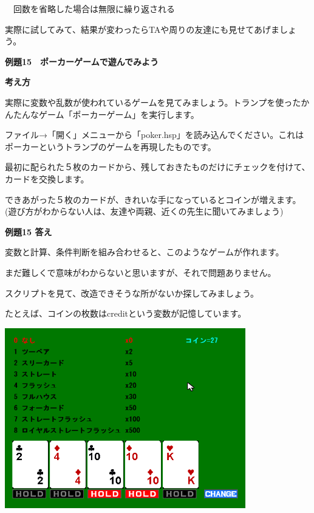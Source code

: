 \documentclass[a4paper,dvipdfmx]{jarticle}
\newcommand\textstyleqwerty[1]{#1}
\begin{document}
\ \ 回数を省略した場合は無限に繰り返される


\bigskip

実際に試してみて、結果が変わったらTAや周りの友達にも見せてあげましょう。


\bigskip


\bigskip


\bigskip

\textstyleqwerty{\textbf{例題15　ポーカーゲームで遊んでみよう}}


\bigskip

{\bfseries
考え方}


\bigskip

実際に変数や乱数が使われているゲームを見てみましょう。トランプを使ったかんたんなゲーム「ポーカーゲーム」を実行します。

ファイル→「開く」メニューから「poker.hsp」を読み込んでください。これはポーカーというトランプのゲームを再現したものです。

最初に配られた５枚のカードから、残しておきたものだけにチェックを付けて、カードを交換します。

できあがった５枚のカードが、きれいな手になっているとコインが増えます。(遊び方がわからない人は、友達や両親、近くの先生に聞いてみましょう)


\bigskip

{\bfseries
例題15 答え}


\bigskip

変数と計算、条件判断を組み合わせると、このようなゲームが作れます。

まだ難しくで意味がわからないと思いますが、それで問題ありません。

スクリプトを見て、改造できそうな所がないか探してみましょう。

たとえば、コインの枚数はcreditという変数が記憶しています。


\bigskip



\begin{center}
\includegraphics[width=10.478cm,height=7.844cm]{text02-img/text02-img053.png}

\end{center}
\end{document}
